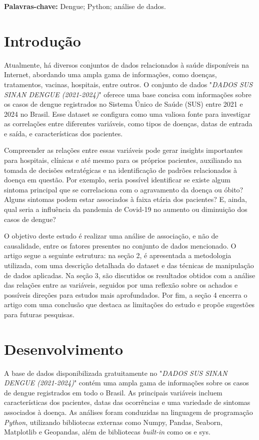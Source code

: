 \documentclass[a4paper, 12pt, twoside]{article}
\begin{document}
\noindent \textbf{Palavras-chave:} Dengue; Python; análise de dados.

\section{Introdução}

Atualmente, há diversos conjuntos de dados relacionados à saúde disponíveis na Internet, abordando uma ampla gama de informações, como doenças, tratamentos, vacinas, hospitais, entre outros. O conjunto de dados "\textit{DADOS SUS SINAN DENGUE (2021-2024)}" oferece uma base concisa com informações sobre os casos de dengue registrados no Sistema Único de Saúde (SUS) entre 2021 e 2024 no Brasil. Esse dataset se configura como uma valiosa fonte para investigar as correlações entre diferentes variáveis, como tipos de doenças, datas de entrada e saída, e características dos pacientes.

Compreender as relações entre essas variáveis pode gerar insights importantes para hospitais, clínicas e até mesmo para os próprios pacientes, auxiliando na tomada de decisões estratégicas e na identificação de padrões relacionados à doença em questão. Por exemplo, seria possível identificar se existe algum sintoma principal que se correlaciona com o agravamento da doença ou óbito? Alguns sintomas podem estar associados à faixa etária dos pacientes? E, ainda, qual seria a influência da pandemia de Covid-19 no aumento ou diminuição dos casos de dengue?

O objetivo deste estudo é realizar uma análise de associação, e não de causalidade, entre os fatores presentes no conjunto de dados mencionado. O artigo segue a seguinte estrutura: na seção 2, é apresentada a metodologia utilizada, com uma descrição detalhada do dataset e das técnicas de manipulação de dados aplicadas. Na seção 3, são discutidos os resultados obtidos com a análise das relações entre as variáveis, seguidos por uma reflexão sobre os achados e possíveis direções para estudos mais aprofundados. Por fim, a seção 4 encerra o artigo com uma conclusão que destaca as limitações do estudo e propõe sugestões para futuras pesquisas.

\section{Desenvolvimento}
A base de dados disponibilizada gratuitamente no "\textit{DADOS SUS SINAN DENGUE (2021-2024)}" \cite{henrique2023} contém uma ampla gama de informações sobre os casos de dengue registrados em todo o Brasil. As principais variáveis incluem características dos pacientes, datas das ocorrências e uma variedade de sintomas associados à doença. As análises foram conduzidas na linguagem de programação \emph{Python}, utilizando bibliotecas externas como Numpy, Pandas, Seaborn, Matplotlib e Geopandas, além de bibliotecas \emph{built-in} como os e sys.
\end{document}

